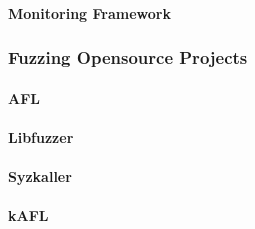 \paragraph{Monitoring Framework}

\subsubsection{Fuzzing Opensource Projects}

\paragraph{AFL}

\paragraph{Libfuzzer}

\paragraph{Syzkaller}

\paragraph{kAFL}